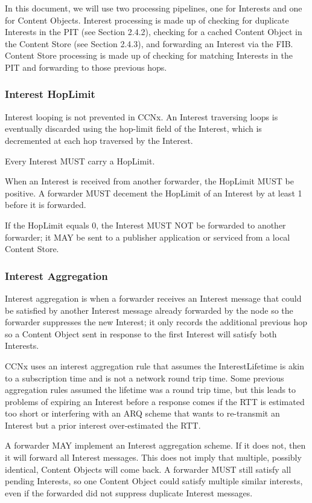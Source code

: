 \documentclass[12pt]{article}
\begin{document}
In this document, we will use two processing pipelines, one for
Interests and one for Content Objects.  Interest processing is made
up of checking for duplicate Interests in the PIT (see
Section 2.4.2), checking for a cached Content Object in the Content
Store (see Section 2.4.3), and forwarding an Interest via the FIB.
Content Store processing is made up of checking for matching
Interests in the PIT and forwarding to those previous hops.

\subsubsection{Interest HopLimit}
Interest looping is not prevented in CCNx.  An Interest traversing
loops is eventually discarded using the hop-limit field of the
Interest, which is decremented at each hop traversed by the Interest.

Every Interest MUST carry a HopLimit.

When an Interest is received from another forwarder, the HopLimit
MUST be positive.  A forwarder MUST decement the HopLimit of an
Interest by at least 1 before it is forwarded.

If the HopLimit equals 0, the Interest MUST NOT be forwarded to
another forwarder; it MAY be sent to a publisher application or
serviced from a local Content Store.

\subsubsection{Interest Aggregation}
Interest aggregation is when a forwarder receives an Interest message
that could be satisfied by another Interest message already forwarded
by the node so the forwarder suppresses the new Interest; it only
records the additional previous hop so a Content Object sent in
response to the first Interest will satisfy both Interests.

CCNx uses an interest aggregation rule that assumes the
InterestLifetime is akin to a subscription time and is not a network
round trip time.  Some previous aggregation rules assumed the
lifetime was a round trip time, but this leads to problems of
expiring an Interest before a response comes if the RTT is estimated
too short or interfering with an ARQ scheme that wants to re-transmit
an Interest but a prior interest over-estimated the RTT.

A forwarder MAY implement an Interest aggregation scheme.  If it does
not, then it will forward all Interest messages.  This does not imply
that multiple, possibly identical, Content Objects will come back.  A
forwarder MUST still satisfy all pending Interests, so one Content
Object could satisfy multiple similar interests, even if the
forwarded did not suppress duplicate Interest messages.
\end{document}
